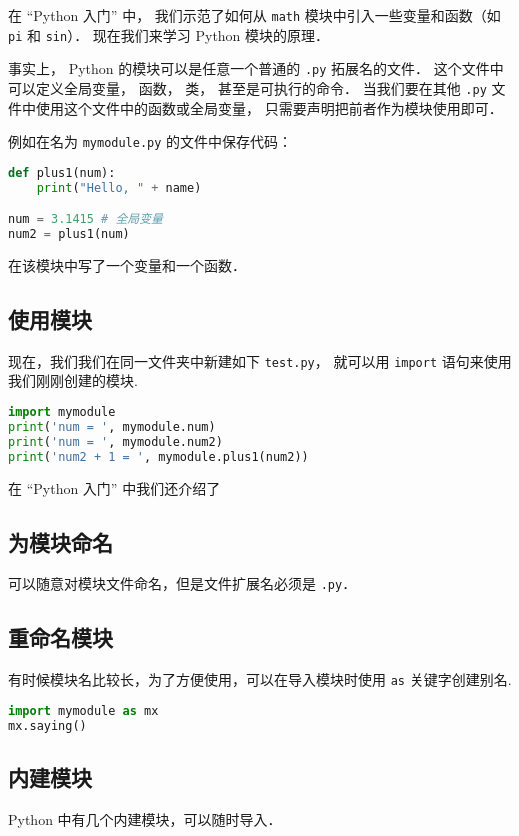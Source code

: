 

在 “Python 入门” 中， 我们示范了如何从 \verb|math| 模块中引入一些变量和函数（如 \verb|pi| 和 \verb|sin|）． 现在我们来学习 Python 模块的原理．

事实上， Python 的模块可以是任意一个普通的 \verb|.py| 拓展名的文件． 这个文件中可以定义全局变量， 函数， 类， 甚至是可执行的命令． 当我们要在其他 \verb|.py| 文件中使用这个文件中的函数或全局变量， 只需要声明把前者作为模块使用即可．

例如在名为 \verb|mymodule.py| 的文件中保存代码：
\begin{lstlisting}[language=python]
def plus1(num):
    print("Hello, " + name)

num = 3.1415 # 全局变量
num2 = plus1(num)
\end{lstlisting}
在该模块中写了一个变量和一个函数．

\subsection{使用模块}
现在，我们我们在同一文件夹中新建如下 \verb|test.py|， 就可以用 \verb|import| 语句来使用我们刚刚创建的模块.
\begin{lstlisting}[language=python]
import mymodule
print('num = ', mymodule.num)
print('num = ', mymodule.num2)
print('num2 + 1 = ', mymodule.plus1(num2))
\end{lstlisting}
在 “Python 入门” 中我们还介绍了

\subsection{为模块命名}
可以随意对模块文件命名，但是文件扩展名必须是 \verb|.py|．

\subsection{重命名模块}
有时候模块名比较长，为了方便使用，可以在导入模块时使用 \verb|as| 关键字创建别名.
\begin{lstlisting}[language=python]
import mymodule as mx
mx.saying()
\end{lstlisting}

\subsection{内建模块}
Python 中有几个内建模块，可以随时导入．
